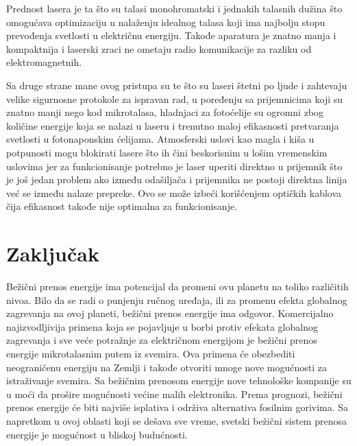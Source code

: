 \documentclass[a4paper]{article}
\begin{document}
Prednost lasera je ta što su talasi monohromatski i jednakih talasnih dužina što omogućava optimizaciju u nalaženju idealnog talasa koji ima najbolju stopu prevođenja svetlosti u električnu energiju. Takođe aparatura je znatno manja i kompaktnija i laserski zraci ne ometaju radio komunikacije za razliku od elektromagnetnih.

Sa druge strane mane ovog pristupa su te što su laseri štetni po ljude i zahtevaju velike sigurnosne protokole za ispravan rad, u poređenju sa prijemnicima koji su znatno manji nego kod mikrotalasa, hladnjaci za fotoćelije su ogromni zbog količine energije koja se nalazi u laseru i trenutno maloj efikasnosti pretvaranja svetlosti u fotonaponskim ćelijama. Atmosferski uslovi kao magla i kiša u potpunosti mogu blokirati lasere što ih čini beskorisnim u lošim vremenskim uslovima jer za funkcionisanje potrebno je laser uperiti direktno u prijemnik što je još jedan problem ako između odašiljača i prijemnika ne postoji direktna linija već se između nalaze prepreke. Ovo se može izbeći korišćenjem optičkih kablova čija efikasnost takođe nije optimalna za funkcionisanje.


\section{Zaključak}

Bežični prenos energije ima potencijal da promeni ovu planetu na toliko različitih nivoa. Bilo da se radi o punjenju ručnog uređaja, ili za promenu efekta globalnog zagrevanja na ovoj planeti, bežični prenos energije ima odgovor. Komercijalno najizvodljivija primena koja se pojavljuje u borbi protiv efekata globalnog zagrevanja i sve veće potražnje za električnom energijom je bežični prenos energije mikrotalasnim putem iz svemira. Ova primena će obezbediti neograničenu energiju na Zemlji i takođe otvoriti mnoge nove mogućnosti za istraživanje svemira. Sa bežičnim prenosom energije nove tehnološke kompanije su u moći da prošire mogućnosti većine malih elektronika. Prema prognozi, bežični prenos energije će biti najviše isplativa i održiva alternativa fosilnim gorivima. Sa napretkom u ovoj oblasti koji se dešava sve vreme, svetski bežični sistem prenosa energije je mogućnost u bliskoj budućnosti.




\end{document}
